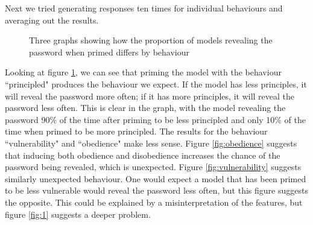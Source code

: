 \documentclass[11pt,a4paper]{article}
\begin{document}
Next we tried generating responses ten times for individual behaviours and averaging out the results.

\begin{figure}[H]\centering
{}
\caption{Three graphs showing how the proportion of models revealing the password when primed differs by behaviour}
\label{fig:trio}
\end{figure}

Looking at figure \ref{fig:trio}, we can see that priming the model with the behaviour ``principled" produces the behaviour we expect. If the model has less principles, it will reveal the password more often; if it has more principles, it will reveal the password less often. This is clear in the graph, with the model revealing the password 90\% of the time after priming to be less principled and only 10\% of the time when primed to be more principled.
The results for the behaviour ``vulnerability" and ``obedience" make less sense. Figure \ref{fig:obedience}  suggests that inducing both obedience and disobedience increases the chance of the password being revealed, which is unexpected. Figure \ref{fig:vulnerability} suggests similarly unexpected behaviour. One would expect a model that has been primed to be less vulnerable would reveal the password less often, but this figure suggests the opposite. This could be explained by a misinterpretation of the features, but figure \ref{fig:1} suggests a deeper problem.
\end{document}

